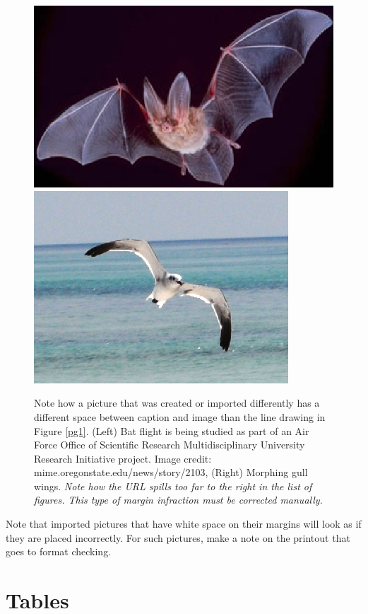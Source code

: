 \begin{figure}[h] %

\ \\
\vspace*{-.18in}

\begin{center}
\includegraphics[width=.45\linewidth]{figs/bat_b.eps}\hspace*{0.04in}
\includegraphics[width=.36\linewidth]{figs/gull2_b.eps}\\
\end{center}
\vspace{-.1in}

\caption
{
Note how a picture that was created or imported differently has a different
space between caption and image than the line drawing in Figure
\protect\ref{pg1}. (Left) Bat flight is being studied as part of an
Air Force Office of Scientific Research Multidisciplinary
University Research Initiative project.
Image credit: mime.oregonstate.edu/news/story/2103, (Right)
Morphing gull wings.
{\em Note how the URL spills too far to the right in the
list of figures. This type of margin infraction must be
corrected manually.}}
\label{batgull2}
\end{figure}



Note that imported pictures that have white space on their margins
will look
as if they are placed incorrectly. For such pictures,
make a note on the printout that goes to format checking.



\section{Tables}

